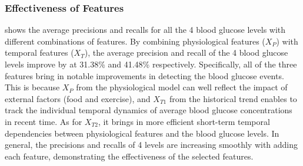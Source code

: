 \subsubsection{Effectiveness of Features}
 shows the average precisions and recalls for all the 4 blood glucose levels with different combinations of features.
By combining physiological features ($X_{P}$) with temporal features ($X_{T}$), the average precision and recall of the 4 blood glucose levels improve by at 31.38\% and 41.48\% respectively.
Specifically, all of the three features bring in notable improvements in detecting the blood glucose events.
This is because $X_{P}$ from the physiological model can well reflect the impact of external factors (\eg food and exercise), and $X_{T1}$ from the historical trend enables to track the individual temporal dynamics of average blood glucose concentrations in recent time. As for $X_{T2}$, it brings in  more efficient short-term temporal dependencies between physiological features and the blood glucose levels.
In general, the precisions and recalls of 4 levels are increasing smoothly with adding each feature, demonstrating the effectiveness of the selected features.
